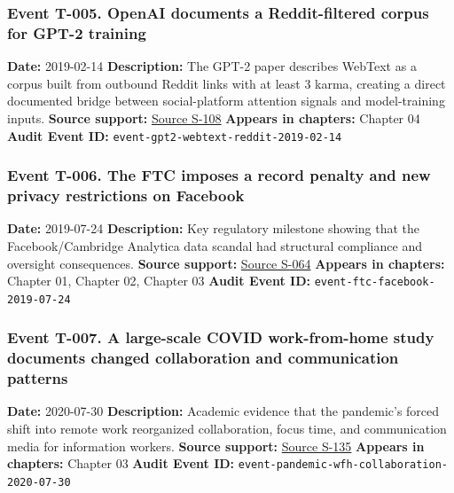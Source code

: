 \documentclass[
  american,
  11pt,
  letterpaper,
]{article}
\begin{document}
\subsubsection{Event T-005. OpenAI documents a Reddit-filtered corpus
for GPT-2
training}\label{event-t-005-openai-documents-a-reddit-filtered-corpus-for-gpt-2-training}

\textbf{Date:} 2019-02-14 \textbf{Description:} The GPT-2 paper
describes WebText as a corpus built from outbound Reddit links with at
least 3 karma, creating a direct documented bridge between
social-platform attention signals and model-training inputs.
\textbf{Source support:}
\hyperref[source-s-108-language-models-are-unsupervised-multitask-learners]{Source
S-108} \textbf{Appears in chapters:} Chapter 04 \textbf{Audit Event ID:}
\texttt{event-gpt2-webtext-reddit-2019-02-14}

\subsubsection{Event T-006. The FTC imposes a record penalty and new
privacy restrictions on
Facebook}\label{event-t-006-the-ftc-imposes-a-record-penalty-and-new-privacy-restrictions-on-facebook}

\textbf{Date:} 2019-07-24 \textbf{Description:} Key regulatory milestone
showing that the Facebook/Cambridge Analytica data scandal had
structural compliance and oversight consequences. \textbf{Source
support:}
\hyperref[source-s-064-ftc-imposes-5-billion-penalty-and-sweeping-new-privacy-restrictions-on-facebook]{Source
S-064} \textbf{Appears in chapters:} Chapter 01, Chapter 02, Chapter 03
\textbf{Audit Event ID:} \texttt{event-ftc-facebook-2019-07-24}

\subsubsection{Event T-007. A large-scale COVID work-from-home study
documents changed collaboration and communication
patterns}\label{event-t-007-a-large-scale-covid-work-from-home-study-documents-changed-collaboration-and-communication-patterns}

\textbf{Date:} 2020-07-30 \textbf{Description:} Academic evidence that
the pandemic's forced shift into remote work reorganized collaboration,
focus time, and communication media for information workers.
\textbf{Source support:}
\hyperref[source-s-135-how-work-from-home-affects-collaboration-a-large-scale-study-of-information-workers-in-a-natural-experiment-during-covid-19]{Source
S-135} \textbf{Appears in chapters:} Chapter 03 \textbf{Audit Event ID:}
\texttt{event-pandemic-wfh-collaboration-2020-07-30}
\end{document}
